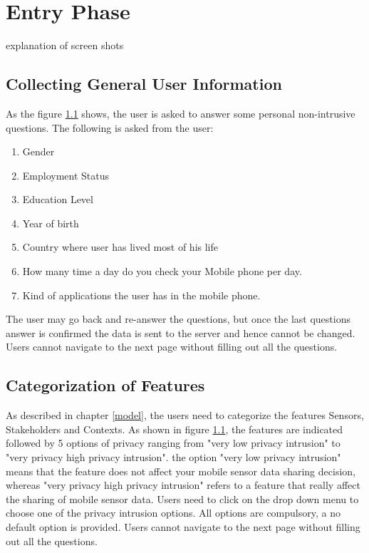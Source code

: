 \section{Entry Phase}
explanation of screen shots

\subsection{Collecting General User Information}
As the figure \ref{} shows, the user is asked to answer some personal non-intrusive questions. The following is asked from the user: 
\begin{enumerate}
    \item Gender
    \item Employment Status
    \item Education Level
    \item Year of birth
    \item Country where user has lived most of his life
    \item How many time a day do you check your Mobile phone per day.
    \item Kind of applications the user has in the mobile phone.
\end{enumerate}

The user may go back and re-answer the questions, but once the last questions answer is confirmed the data is sent to the server
and hence cannot be changed. Users cannot navigate to the next page without filling out all the questions.

\subsection{Categorization of Features} \label{cat_feature}

As described in chapter \ref{model}, the users need to categorize the features Sensors, Stakeholders and Contexts. As shown in figure 
\ref{}, the features are indicated followed by 5 options of privacy ranging from "very low privacy intrusion" to "very privacy high privacy intrusion". the option "very low privacy intrusion" means that the feature does not affect your mobile sensor data sharing decision, whereas 
"very privacy high privacy intrusion" refers to a feature that really affect the sharing of mobile sensor data. Users need to click on the
drop down menu to choose one of the privacy intrusion options. All options are compulsory, a no default option is provided. Users cannot navigate 
to the next page without filling out all the questions.

